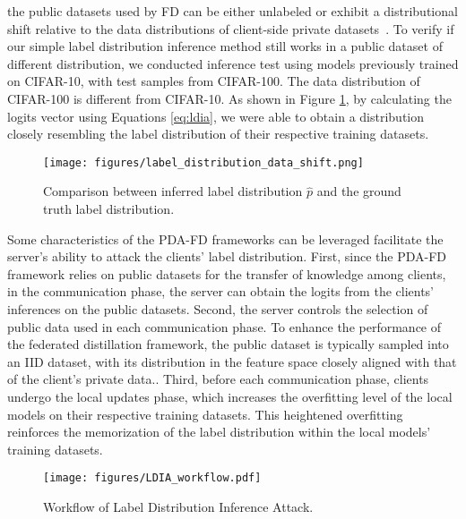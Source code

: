 the public datasets used by FD can be either unlabeled or exhibit a distributional shift relative to the data distributions of client-side private datasets~\cite{itahara2021distillation, li2019fedmd}.  To verify if our simple label distribution inference method still works in a public dataset of different distribution,
we conducted inference test using models previously trained on CIFAR-10, with test samples from CIFAR-100\cite{krizhevsky2009learning}. The data distribution of CIFAR-100 is different from CIFAR-10.
As shown in Figure \ref{fig:label_distribution_different_datasets}, by calculating the logits vector using Equations \ref{eq:ldia}, we were able to obtain a distribution closely resembling the label distribution of their respective training datasets.
\begin{figure}[h]
    \centering
    \texttt{[image: figures/label\_distribution\_data\_shift.png]}
    \caption{Comparison between inferred label distribution $\hat{p}$ and the ground truth label distribution.}
    \label{fig:label_distribution_different_datasets}
\end{figure}

Some characteristics of the PDA-FD frameworks can be leveraged facilitate the server’s ability to attack the clients’ label distribution. 
First, since the PDA-FD framework relies on public datasets for the transfer of knowledge among clients, in the communication phase, the server can obtain the logits from the clients’ inferences on the public datasets.
Second, the server controls the selection of public data used in each communication phase. To enhance the performance of the federated distillation framework, the public dataset is typically sampled into an IID dataset, with its distribution in the feature space closely aligned with that of the client's private data.\cite{li2024federated}.
Third, before each communication phase, clients undergo the local updates phase, which increases the overfitting level of the local models on their respective training datasets. 
This heightened overfitting reinforces the memorization of the label distribution within the local models' training datasets.
\fi

\begin{figure}
    \centering
    \texttt{[image: figures/LDIA\_workflow.pdf]}
    \caption{Workflow of Label Distribution Inference Attack.}
    \label{fig:LDIA_workflow}
\end{figure}

